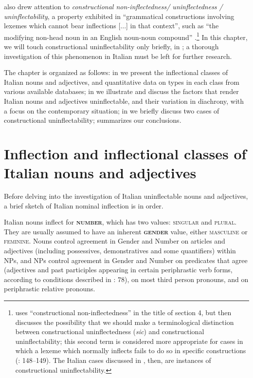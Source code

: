 \documentclass[output=paper]{langscibook}
\begin{document}
\citet{Spencer2020} also drew attention to \textit{constructional non-inflectedness/ uninflectedness / uninflectability}, a property exhibited in “grammatical constructions involving lexemes which cannot bear inflections [...] in that context”, such as “the modifying non-head noun in an English noun-noun compound” \citep[148]{Spencer2020}.\footnote{\citet{Spencer2020} uses “constructional non-inflectedness” in the title of section 4, but then discusses the possibility that we should make a terminological distinction between constructional uninflectedness (\textit{sic}) and constructional uninflectability; this second term is considered more appropriate for cases in which a lexeme which normally inflects fails to do so in specific constructions (\citealt{Spencer2020}: 148–149). The Italian cases discussed in , then, are instances of constructional uninflectability.} In this chapter, we will touch constructional uninflectability only briefly, in ; a thorough investigation of this phenomenon in Italian must be left for further research.

The chapter is organized as follows: in  we present the inflectional classes of Italian nouns and adjectives, and quantitative data on types in each class from various available databases; in  we illustrate and discuss the factors that render Italian nouns and adjectives uninflectable, and their variation in diachrony, with a focus on the contemporary situation; in  we briefly discuss two cases of constructional uninflectability;  summarizes our conclusions.

\section{Inflection and inflectional classes of Italian nouns and adjectives}

Before delving into the investigation of Italian uninflectable nouns and adjectives, a brief sketch of Italian nominal inflection is in order.

Italian nouns inflect for \textbf{\textsc{number}}, which has two values: \textsc{singular} and \textsc{plural}. They are usually assumed to have an inherent \textbf{\textsc{gender}} value, either \textsc{masculine} or \textsc{feminine}. Nouns control agreement in Gender and Number on articles and adjectives (including possessives, demonstratives and some quantifiers) within NPs, and NPs control agreement in Gender and Number on predicates that agree (adjectives and past participles appearing in certain periphrastic verb forms, according to conditions described in \citealt{Thornton2019}: 78), on most third person pronouns, and on periphrastic relative pronouns.
\end{document}
